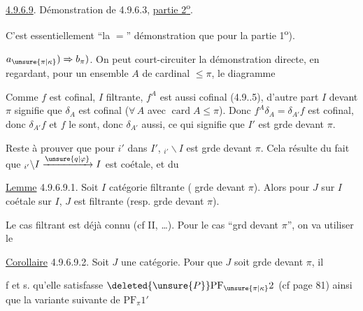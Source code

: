 
\uline{4.9.6.9}. Démonstration de 4.9.6.3, \uline{partie 2\textsuperscript{o}}.

C'est essentiellement ``la $=$'' démonstration que pour la partie 1\textsuperscript{o}).

$a_{\unsure{\pi|\kappa}})\Rightarrow b_\pi)$. On peut court-circuiter la démonstration directe, en regardant, pour un ensemble $A$ de cardinal $\leq\pi$, le diagramme


Comme $f$ est cofinal,  $I$ filtrante, $f^A$ est aussi cofinal (4.9..5), d'autre part $I$  devant $\pi$ signifie que $\delta_A$ est cofinal ($\forall\, A$ avec $\operatorname{card} A\leq\pi$). Donc $f^A\delta_A=\delta_{A'}f$ est cofinal, donc $\delta_{A'}f$ et $f$ le sont, donc $\delta_{A'}$ aussi, ce qui signifie que $I'$ est grde devant $\pi$.

Reste à prouver que pour $i'$ dans $I'$, $ {}_{i'}\backslash I$ est grde devant $\pi$. Cela résulte du fait que $ {}_{i'}\backslash I\xrightarrow{\unsure{q|\varphi}}I$ est coétale,  et du

\uline{Lemme} 4.9.6.9.1. Soit $I$  catégorie filtrante ( grde devant $\pi$).  Alors pour  $J$ sur $I$ coétale sur $I$,  $J$ est filtrante (resp. grde devant $\pi$).

 

Le cas filtrant est déjà connu (cf II, \ldots). Pour le cas ``grd devant $\pi$'', on va utiliser le

\uline{Corollaire} 4.9.6.9.2. Soit $J$ une catégorie. Pour que $J$ soit grde devant $\pi$, il


f et s. qu'elle  satisfasse $\deleted{\unsure{P}}\mathrm{PF}_{\unsure{\pi|\kappa}}2$ (cf page 81) ainsi que la variante suivante de $\mathrm{PF}_\pi1'$

